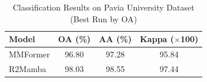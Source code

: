 \begin{table}[htbp]
\centering
\caption{Classification Results on Pavia University Dataset (Best Run by OA)}
\label{tab:pavia university_results_arranged}
\begin{tabular}{lccc}
\toprule
Model & OA (\%) & AA (\%) & Kappa ($\times$100) \\
\midrule
MMFormer & 96.80 & 97.28 & 95.84 \\
R2Mamba & 98.03 & 98.55 & 97.44 \\
\bottomrule
\end{tabular}
\end{table}